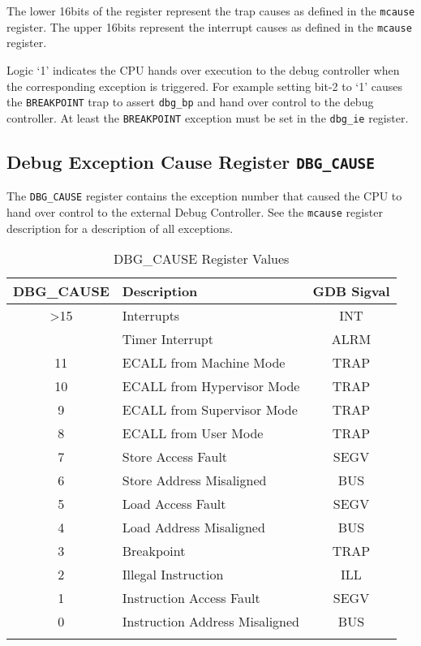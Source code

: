 The lower 16bits of the register represent the trap causes as defined in
the \texttt{mcause} register. The upper 16bits represent the interrupt causes as
defined in the \texttt{mcause} register.

Logic `1' indicates the CPU hands over execution to the debug controller
when the corresponding exception is triggered. For example setting bit-2
to `1' causes the \texttt{BREAKPOINT} trap to assert \texttt{dbg\_bp} and hand over
control to the debug controller. At least the \texttt{BREAKPOINT} exception must
be set in the \texttt{dbg\_ie} register.

\subsection{Debug Exception Cause Register
\texttt{DBG\_CAUSE}}\label{debug-exception-cause-register-dbg_cause}



The \texttt{DBG\_CAUSE} register contains the exception number that caused the
CPU to hand over control to the external Debug Controller. See the
\texttt{mcause} register description for a description of all exceptions.

\begin{longtable}[]{@{}clc@{}}
	\toprule
	\textbf{DBG\_CAUSE} & \textbf{Description}           & \textbf{GDB Sigval}\tabularnewline
	\midrule
	\endhead
	\textgreater{}15    & Interrupts                     & INT\tabularnewline
	                    & Timer Interrupt                & ALRM\tabularnewline
	11                  & ECALL from Machine Mode        & TRAP\tabularnewline
	10                  & ECALL from Hypervisor Mode     & TRAP\tabularnewline
	9                   & ECALL from Supervisor Mode     & TRAP\tabularnewline
	8                   & ECALL from User Mode           & TRAP\tabularnewline
	7                   & Store Access Fault             & SEGV\tabularnewline
	6                   & Store Address Misaligned       & BUS\tabularnewline
	5                   & Load Access Fault              & SEGV\tabularnewline
	4                   & Load Address Misaligned        & BUS\tabularnewline
	3                   & Breakpoint                     & TRAP\tabularnewline
	2                   & Illegal Instruction            & ILL\tabularnewline
	1                   & Instruction Access Fault       & SEGV\tabularnewline
	0                   & Instruction Address Misaligned & BUS\tabularnewline
	\bottomrule
	\caption{DBG\_CAUSE Register Values}
\end{longtable}

